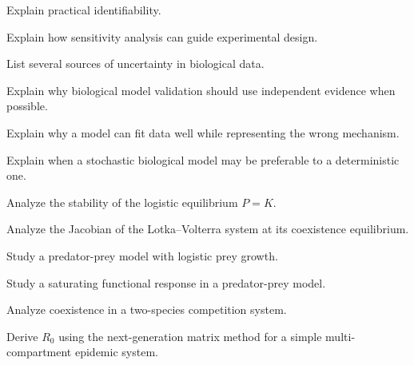 \begin{exercise}[3]
Explain practical identifiability.
\end{exercise}

\begin{exercise}[3]
Explain how sensitivity analysis can guide experimental design.
\end{exercise}

\begin{exercise}[3]
List several sources of uncertainty in biological data.
\end{exercise}

\begin{exercise}[3]
Explain why biological model validation should use independent evidence when
possible.
\end{exercise}

\begin{exercise}[3]
Explain why a model can fit data well while representing the wrong
mechanism.
\end{exercise}

\begin{exercise}[3]
Explain when a stochastic biological model may be preferable to a
deterministic one.
\end{exercise}

\begin{exercise}[4]
Analyze the stability of the logistic equilibrium \(P=K\).
\end{exercise}

\begin{exercise}[4]
Analyze the Jacobian of the Lotka--Volterra system at its coexistence
equilibrium.
\end{exercise}

\begin{exercise}[4]
Study a predator-prey model with logistic prey growth.
\end{exercise}

\begin{exercise}[4]
Study a saturating functional response in a predator-prey model.
\end{exercise}

\begin{exercise}[4]
Analyze coexistence in a two-species competition system.
\end{exercise}

\begin{exercise}[4]
Derive \(R_0\) using the next-generation matrix method for a simple
multi-compartment epidemic system.
\end{exercise}

